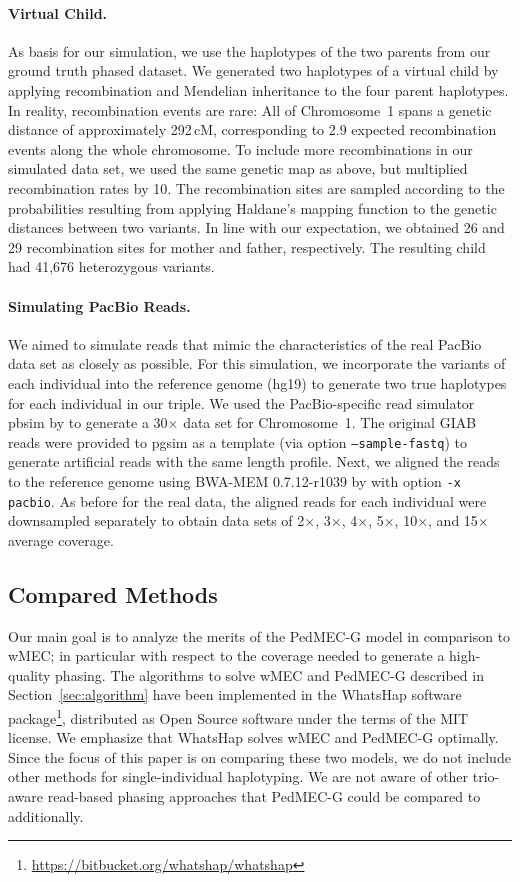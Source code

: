 \paragraph{Virtual Child.}
As basis for our simulation, we use the haplotypes of the two parents from our ground truth phased dataset.
We generated two haplotypes of a virtual child by applying recombination and Mendelian inheritance to the four parent haplotypes.
In reality, recombination events are rare: All of Chromosome~1 spans a genetic distance of approximately 292\,cM, corresponding to 2.9 expected recombination events along the whole chromosome.
To include more recombinations in our simulated data set, we used the same genetic map as above, but multiplied recombination rates by 10.
The recombination sites are sampled according to the probabilities resulting from applying Haldane's mapping function to the genetic distances between two variants.
In line with our expectation, we obtained 26 and 29 recombination sites for mother and father, respectively. 
The resulting child had 41,676 heterozygous variants.

\paragraph{Simulating PacBio Reads.}
We aimed to simulate reads that mimic the characteristics of the real PacBio data set as closely as possible.
For this simulation, we incorporate the variants of each individual into the reference genome (hg19) to generate two true haplotypes for each individual in our triple.
We used the PacBio-specific read simulator pbsim by \cite{pbsim} to generate a 30$\times$ data set for Chromosome~1.
The original GIAB reads were provided to pgsim as a template (via option \texttt{--sample-fastq}) to generate artificial reads with the same length profile.
Next, we aligned the reads to the reference genome using BWA-MEM 0.7.12-r1039 by \cite{bwa} with option \texttt{-x pacbio}.
As before for the real data, the aligned reads for each individual were downsampled separately to obtain data sets of 2$\times$, 3$\times$, 4$\times$, 5$\times$, 10$\times$, and 15$\times$ average coverage.

\subsection{Compared Methods}
Our main goal is to analyze the merits of the PedMEC-G model in comparison to wMEC; in particular with respect to the coverage needed to generate a high-quality phasing.
The algorithms to solve wMEC and PedMEC-G described in Section~\ref{sec:algorithm} have been implemented in the WhatsHap software package\footnote{\scriptsize{\url{https://bitbucket.org/whatshap/whatshap}}}, distributed as Open Source software under the terms of the MIT license.
We emphasize that WhatsHap solves wMEC and PedMEC-G optimally.
Since the focus of this paper is on comparing these two models, we do not include other methods for single-individual haplotyping.
We are not aware of other trio-aware read-based phasing approaches that PedMEC-G could be compared to additionally.

